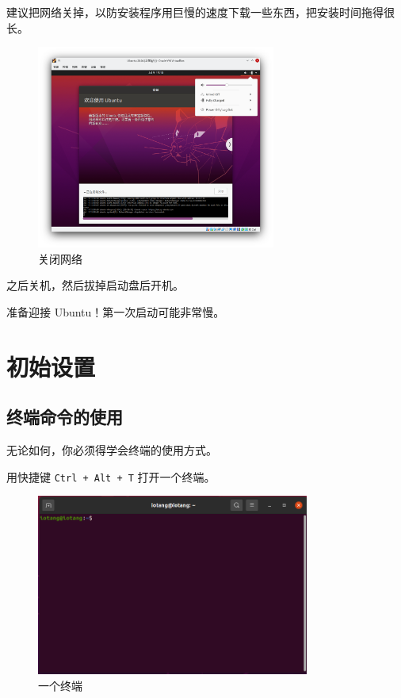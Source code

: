 \documentclass[UTF-8]{ctexart}
\begin{document}
				建议把网络关掉，以防安装程序用巨慢的速度下载一些东西，把安装时间拖得很长。
			
				\begin{figure}[H]
					\centering
					\includegraphics[width=0.7\textwidth]{fig/ubuntu_install_8.png}
					\caption*{关闭网络}
				\end{figure}
			
				之后关机，然后拔掉启动盘后开机。
				
				准备迎接 Ubuntu！第一次启动可能非常慢。
			
	\newpage
		
	\section{初始设置}
	
		\subsection{终端命令的使用}
		
			无论如何，你必须得学会终端的使用方式。
		
			用快捷键 \texttt{Ctrl + Alt + T} 打开一个终端。
			
			\begin{figure}[H]
				\centering
				\includegraphics[width=0.8\textwidth]{fig/terminal.png}
				\caption*{一个终端}
			\end{figure}
		
\end{document}
